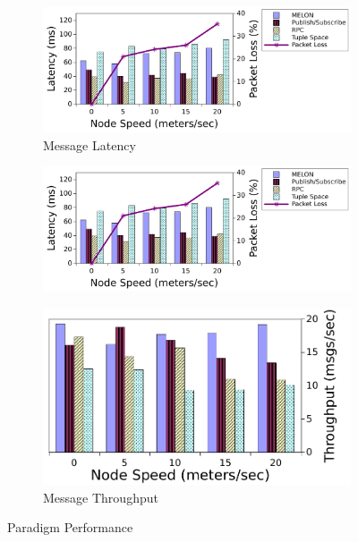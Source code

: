 \documentclass[lnicst]{svmultln}
\begin{document}
\begin{figure}
\centering

\begin{subfigure}{.41\textwidth}
\centering
\includegraphics[width = \linewidth, clip, trim = 0px 0px 160px 0px]{figures/latency.pdf}
\caption{Message Latency}
\label{fig:latency}
\end{subfigure}%
\begin{subfigure}{.18\textwidth}
\centering
\includegraphics[width = \linewidth, clip, trim = 390px 0px 0px 0px]{figures/latency.pdf}
\end{subfigure}%
\begin{subfigure}{.41\textwidth}
\centering
\includegraphics[width = \linewidth, clip, trim = 0px 0px 0px 0px]{figures/throughput.pdf}
\caption{Message Throughput}
\label{fig:throughput}
\end{subfigure}
\caption{Paradigm Performance}
\end{figure}
\end{document}
